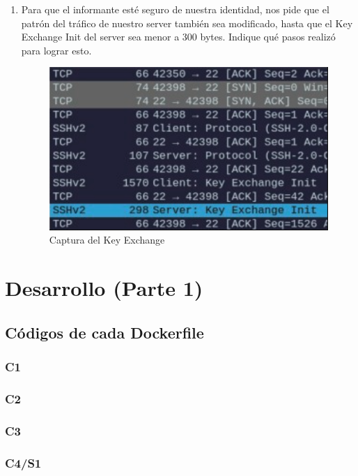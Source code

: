 \documentclass[letter,12pt]{article}
\begin{document}
\begin{enumerate}
\item Para que el informante esté seguro de nuestra identidad, nos pide que el patrón del tráfico de nuestro server también sea modificado, hasta que el Key Exchange Init del server sea menor a 300 bytes. Indique qué pasos realizó para lograr esto.

\begin{figure}[ht]
    \centering
    \includegraphics[width=1\linewidth]{Desarrollo/exchange.png}
    \caption{Captura del Key Exchange}
    \label{fig:exchange}
\end{figure}

\end{enumerate}

\section{Desarrollo (Parte 1)}

\subsection{Códigos de cada Dockerfile}
\subsubsection{C1}
\subsubsection{C2}
\subsubsection{C3}
\subsubsection{C4/S1}
\end{document}
